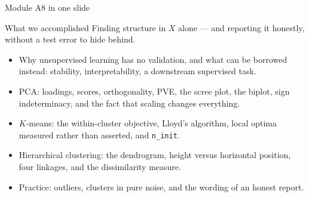 \documentclass[aspectratio=169,11pt]{beamer}
\begin{document}
\begin{frame}{Module A8 in one slide}
  \begin{block}{What we accomplished}
    Finding structure in $X$ alone --- and reporting it honestly, without a test error to
    hide behind.
  \end{block}
  \begin{itemize}
    \item Why unsupervised learning has no validation, and what can be borrowed instead:
          stability, interpretability, a downstream supervised task.
    \item PCA: loadings, scores, orthogonality, PVE, the scree plot, the biplot, sign
          indeterminacy, and the fact that scaling changes everything.
    \item $K$-means: the within-cluster objective, Lloyd's algorithm, local optima
          measured rather than asserted, and \texttt{n\_init}.
    \item Hierarchical clustering: the dendrogram, height versus horizontal position,
          four linkages, and the dissimilarity measure.
    \item Practice: outliers, clusters in pure noise, and the wording of an honest report.
  \end{itemize}
\end{frame}
\end{document}
